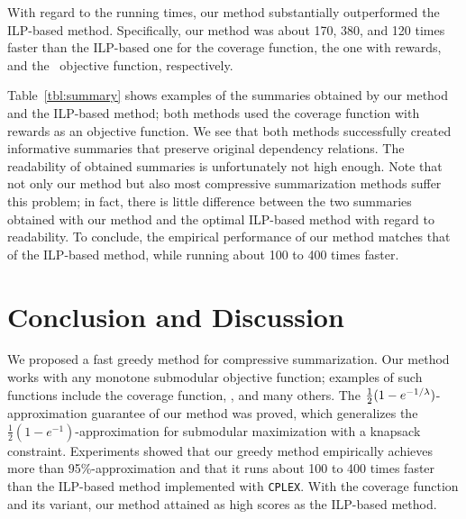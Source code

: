 \documentclass[11pt,a4paper]{article}
\begin{document}
	With regard to the running times, 
	our method substantially outperformed the ILP-based method. 
	Specifically, our method was about 170, 380, and 120 times faster 
	than the ILP-based one for 
	the  
	coverage function, 
	the one with rewards, 
	and the \ objective function, 
	respectively. 
	
	Table~\ref{tbl:summary} shows examples of the summaries obtained by our method and the ILP-based method; 
	both methods used the coverage function with rewards as 
	an objective function. 
	We see that both methods successfully created  
	informative summaries 
	that preserve original dependency relations. 
	The readability of obtained summaries is unfortunately not high enough. 
	Note that not only our method but also most compressive summarization methods suffer this problem; 
	in fact, 
	there is little difference between the two summaries obtained with our 
	method and the optimal ILP-based method with regard to readability.
	To conclude, 
	the empirical performance of our method 
	matches that of the ILP-based method, 
	while running about 100 to 400 times faster. 
	
	\section{Conclusion and Discussion}
	We proposed a fast greedy method for compressive summarization. 
	Our method works with any monotone submodular objective function; 
	examples of such functions include 
	the coverage function, \rouge, and many others. 
	The $\frac{1}{2}(1-e^{-1/\lambda})$-approximation guarantee of our method was proved, 
	which generalizes the $\frac{1}{2}(1-e^{-1})$-approximation for 
	submodular maximization with a knapsack constraint. 
	Experiments showed that 
	our greedy method empirically achieves more than 
	95\%-approximation 
	and that it runs 
	about 100 to 400 times faster than 
	the ILP-based method implemented with {\tt CPLEX}.
	With the coverage function and its variant, 
	our method attained as high 
	 scores as the ILP-based method. 
	
\end{document}

